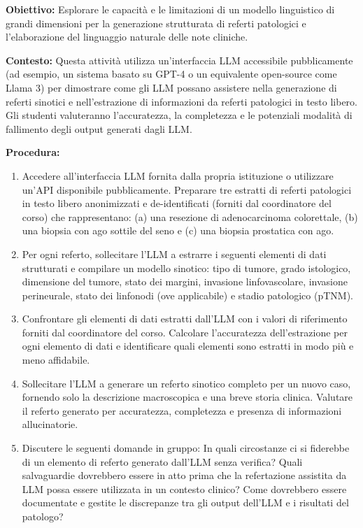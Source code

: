 \textbf{Obiettivo:} Esplorare le capacità e le limitazioni di un modello linguistico di grandi dimensioni per la generazione strutturata di referti patologici e l'elaborazione del linguaggio naturale delle note cliniche.

\textbf{Contesto:} Questa attività utilizza un'interfaccia LLM accessibile pubblicamente (ad esempio, un sistema basato su GPT-4 o un equivalente open-source come Llama 3) per dimostrare come gli LLM possano assistere nella generazione di referti sinotici e nell'estrazione di informazioni da referti patologici in testo libero. Gli studenti valuteranno l'accuratezza, la completezza e le potenziali modalità di fallimento degli output generati dagli LLM.

\textbf{Procedura:}
\begin{enumerate}
  \item Accedere all'interfaccia LLM fornita dalla propria istituzione o utilizzare un'API disponibile pubblicamente. Preparare tre estratti di referti patologici in testo libero anonimizzati e de-identificati (forniti dal coordinatore del corso) che rappresentano: (a) una resezione di adenocarcinoma colorettale, (b) una biopsia con ago sottile del seno e (c) una biopsia prostatica con ago.
  \item Per ogni referto, sollecitare l'LLM a estrarre i seguenti elementi di dati strutturati e compilare un modello sinotico: tipo di tumore, grado istologico, dimensione del tumore, stato dei margini, invasione linfovascolare, invasione perineurale, stato dei linfonodi (ove applicabile) e stadio patologico (pTNM).
  \item Confrontare gli elementi di dati estratti dall'LLM con i valori di riferimento forniti dal coordinatore del corso. Calcolare l'accuratezza dell'estrazione per ogni elemento di dati e identificare quali elementi sono estratti in modo più e meno affidabile.
  \item Sollecitare l'LLM a generare un referto sinotico completo per un nuovo caso, fornendo solo la descrizione macroscopica e una breve storia clinica. Valutare il referto generato per accuratezza, completezza e presenza di informazioni allucinatorie.
  \item Discutere le seguenti domande in gruppo: In quali circostanze ci si fiderebbe di un elemento di referto generato dall'LLM senza verifica? Quali salvaguardie dovrebbero essere in atto prima che la refertazione assistita da LLM possa essere utilizzata in un contesto clinico? Come dovrebbero essere documentate e gestite le discrepanze tra gli output dell'LLM e i risultati del patologo?
\end{enumerate}

